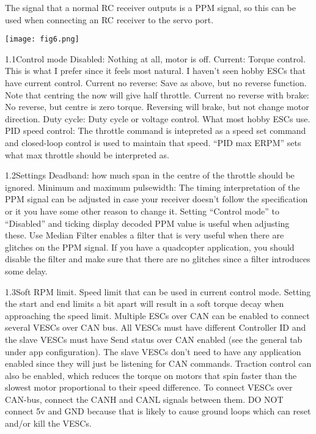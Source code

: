 \documentclass[11pt]{article}
\begin{document}
The signal that a normal RC receiver outputs is a PPM signal, so this can be used when connecting an RC receiver to the servo port.\newline
\begin {center}
\texttt{[image: fig6.png]}\newline
\end{center}
1.1Control mode\newline
Disabled: Nothing at all, motor is off.\newline
Current: Torque control. This is what I prefer since it feels most natural. I haven’t seen hobby ESCs that have current control.\newline
Current no reverse: Save as above, but no reverse function. Note that centring the now will give half throttle.\newline
Current no reverse with brake: No reverse, but centre is zero torque. Reversing will brake, but not change motor direction.\newline
Duty cycle: Duty cycle or voltage control. What most hobby ESCs use\newline.
PID speed control: The throttle command is intepreted as a speed set command and closed-loop control is used to maintain that speed. “PID max ERPM” sets what max throttle should be interpreted as.\newline

1.2Settings\newline
Deadband: how much span in the centre of the throttle should be ignored.\newline
Minimum and maximum pulsewidth: The timing interpretation of the PPM signal can be adjusted in case your receiver doesn’t follow the specification or it you have some other reason to change it. Setting “Control mode” to “Disabled” and ticking display decoded PPM value is useful when adjusting these.\newline
Use Median Filter enables a filter that is very useful when there are glitches on the PPM signal. If you have a quadcopter application, you should disable the filter and make sure that there are no glitches since a filter introduces some delay.\newline

1.3Soft RPM limit.\newline
Speed limit that can be used in current control mode. Setting the start and end limits a bit apart will result in a soft torque decay when approaching the speed limit.\newline
Multiple ESCs over CAN can be enabled to connect several VESCs over CAN bus. All VESCs must have different Controller ID and the slave VESCs must have Send status over CAN enabled (see the general tab under app configuration). The slave VESCs don’t need to have any application enabled since they will just be listening for CAN commands. Traction control can also be enabled, which reduces the torque on motors that spin faster than the slowest motor proportional to their speed difference. To connect VESCs over CAN-bus, connect the CANH and CANL signals between them. DO NOT connect 5v and GND because that is likely to cause ground loops which can reset and/or kill the VESCs.\newline
\end{document}

